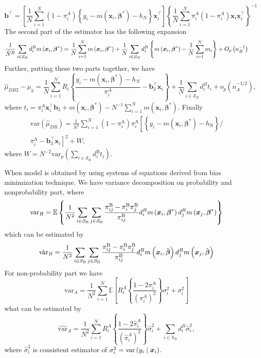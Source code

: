 \documentclass[
  letterpaper,
  DIV=11,
  numbers=noendperiod]{scrreprt}
\begin{document}
\[
\mathbf{b}^{\top}=\left[\frac{1}{N} \sum_{i=1}^N\left(1-\pi_i^A\right)\left\{y_i-m\left(\boldsymbol{x}_i, \boldsymbol{\beta}^*\right)-h_N\right\} \boldsymbol{x}_i^{\top}\right]\left\{\frac{1}{N} \sum_{i=1}^N \pi_i^A\left(1-\pi_i^A\right) \boldsymbol{x}_i \boldsymbol{x}_i^{\top}\right\}^{-1}
\] The second part of the estimator has the following expansion \[
\frac{1}{\hat{N}^B} \sum_{i \in \mathcal{S}_B} d_i^B m\left(\boldsymbol{x}_i,\boldsymbol{\beta}^*\right)=\frac{1}{N} \sum_{i=1}^N m\left(\boldsymbol{x}_i,\boldsymbol{\beta}^*\right)+\frac{1}{N} \sum_{i \in \mathcal{S}_B} d_i^B\left\{m\left(\boldsymbol{x}_i,\boldsymbol{\beta}^*\right)-\frac{1}{N} \sum_{i=1}^N m_i\right\}+O_p\left(n_B^{-1}\right)
\] Further, putting these two parts together, we have \[
\hat{\mu}_{D R 2}-\mu_y=\frac{1}{N} \sum_{i=1}^N R_i\left\{\frac{y_i-m\left(\boldsymbol{x}_i, \boldsymbol{\beta}^*\right)-h_N}{\pi_i^A}-\mathbf{b}_3^{\top} \boldsymbol{x}_i\right\}+\frac{1}{N} \sum_{i \in \mathcal{S}_B} d_i^B t_i+o_p\left(n_A^{-1 / 2}\right),
\] where
\(t_i=\pi_i^A \boldsymbol{x}_i^{\top} \mathbf{b}_3+m\left(\boldsymbol{x}_i, \boldsymbol{\beta}^*\right)-N^{-1} \sum_{i=1}^N m\left(\boldsymbol{x}_i, \boldsymbol{\beta}^*\right)\).
Finally \[
\begin{gathered} \text{var}(\hat{\mu}_{DR}) =
\frac{1}{N^2} \sum_{i=1}^N\left(1-\pi_i^{\mathrm{A}}\right) \pi_i^{\mathrm{A}}\left[\left\{y_i-m\left(\boldsymbol{x}_i, \boldsymbol{\beta}^*\right)-h_{\mathrm{N}}\right\} /\right. \\
\left.\pi_i^{\mathrm{A}}-\mathbf{b}_3^{\top} \boldsymbol{x}_i\right]^2+W,
\end{gathered}
\] where
\(W = N^{-2} \text{var}_p\left(\sum_{i \in \mathcal{S}_{\mathrm{B}}} d_i^{\mathrm{B}} t_i\right)\).

When model is obtained by using systems of equations derived from bias
minimization technique. We have variance decomposition on probability
and nonprobability part, where \[
\text{var}_B = \mathbb{E} \left\{\frac{1}{N^2} \sum_{i \in \mathcal{S}_{\mathrm{B}}} \sum_{j \in \mathcal{S}_{\mathrm{B}}} \frac{\pi_{i j}^{\mathrm{B}}-\pi_i^{\mathrm{B}} \pi_j^{\mathrm{B}}}{\pi_{i j}^{\mathrm{B}}} d_i^B m\left(\boldsymbol{x}_i, \boldsymbol{\beta}^*\right) d_j^B m\left(\boldsymbol{x}_j, \boldsymbol{\beta}^*\right) \right\}
\] which can be estimated by \[
\hat{\text{var}}_B = \frac{1}{N^2} \sum_{i \in \mathcal{S}_{\mathrm{B}}} \sum_{j \in \mathcal{S}_{\mathrm{B}}} \frac{\pi_{i j}^{\mathrm{B}}-\pi_i^{\mathrm{B}} \pi_j^{\mathrm{B}}}{\pi_{i j}^{\mathrm{B}}} d_i^B m\left(\boldsymbol{x}_i, \hat{\boldsymbol{\beta}}\right) d_j^B m\left(\boldsymbol{x}_j, \hat{\boldsymbol{\beta}}\right)
\] For non-probability part we have \[
\text{var}_A = \frac{1}{N^2} \sum_{i=1}^N \mathbb{E} \left[R_i^A \left\{ \frac{1 - 2 \pi_i^A}{\left( \pi_i^A \right) ^2} \right\} \sigma_i^2 + \sigma_i^2 \right]
\] what can be estimated by \[
\hat{\text{var}}_A = \frac{1}{N^2} \sum_{i=1}^N R_i^A \left\{ \frac{1 - 2 \hat{\pi}_i^A}{\left( \hat{\pi}_i^A \right) ^2} \right\} \hat{\sigma}_i^2 + \sum_{i \in S_B} d_i^B \hat{\sigma}_i^2,
\] where \(\hat{\sigma}_i^2\) is consistent estimator of
\(\sigma_i^2 = \text{var}\left(y_i \mid \boldsymbol{x}_i\right)\).
\end{document}
